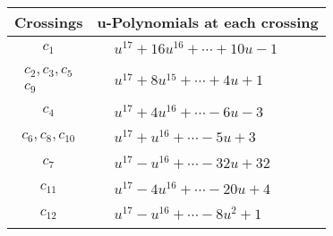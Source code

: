 \documentclass[1p]{elsarticle_modified}
\theoremstyle{definition}
\begin{document}
\begin{tabular}{m{50pt}|m{274pt}}
Crossings & \hspace{64pt}u-Polynomials at each crossing \\
\hline $$\begin{aligned}c_{1}\end{aligned}$$&$\begin{aligned}
&u^{17}+16 u^{16}+\cdots+10 u-1
\end{aligned}$\\
\hline $$\begin{aligned}c_{2},c_{3},c_{5}\\c_{9}\end{aligned}$$&$\begin{aligned}
&u^{17}+8 u^{15}+\cdots+4 u+1
\end{aligned}$\\
\hline $$\begin{aligned}c_{4}\end{aligned}$$&$\begin{aligned}
&u^{17}+4 u^{16}+\cdots-6 u-3
\end{aligned}$\\
\hline $$\begin{aligned}c_{6},c_{8},c_{10}\end{aligned}$$&$\begin{aligned}
&u^{17}+u^{16}+\cdots-5 u+3
\end{aligned}$\\
\hline $$\begin{aligned}c_{7}\end{aligned}$$&$\begin{aligned}
&u^{17}- u^{16}+\cdots-32 u+32
\end{aligned}$\\
\hline $$\begin{aligned}c_{11}\end{aligned}$$&$\begin{aligned}
&u^{17}-4 u^{16}+\cdots-20 u+4
\end{aligned}$\\
\hline $$\begin{aligned}c_{12}\end{aligned}$$&$\begin{aligned}
&u^{17}- u^{16}+\cdots-8 u^2+1
\end{aligned}$\\
\hline
\end{tabular}\\~\\
\newpage\renewcommand{\arraystretch}{1}
\end{document}
